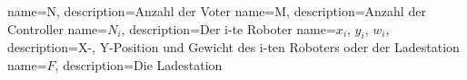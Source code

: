 {
       name={N},
       description={Anzahl der Voter}
}
{
       name={M},
       description={Anzahl der Controller}
}
{
       name={\ensuremath{N_i}},
       description={Der i-te Roboter}
}
{
       name={\ensuremath{x_i}, \ensuremath{y_i}, \ensuremath{w_i}},
       description={X-, Y-Position und Gewicht des i-ten Roboters oder der Ladestation}
}
{
       name={\ensuremath{F}},
       description={Die Ladestation}
}

